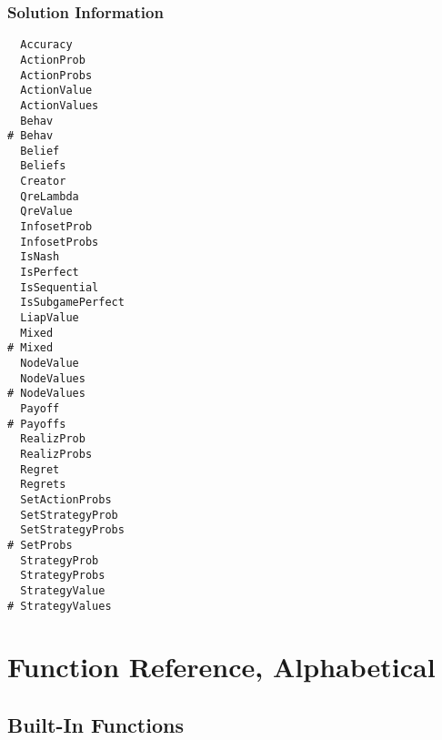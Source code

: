 \subsection{Solution Information}

\begin{multicols}{3}
\begin{verbatim}
  Accuracy
  ActionProb 
  ActionProbs 
  ActionValue 
  ActionValues 
  Behav 
# Behav 
  Belief 
  Beliefs 
  Creator
  QreLambda 
  QreValue 
  InfosetProb 
  InfosetProbs 
  IsNash 
  IsPerfect 
  IsSequential 
  IsSubgamePerfect 
  LiapValue 
  Mixed
# Mixed
  NodeValue 
  NodeValues 
# NodeValues 
  Payoff 
# Payoffs 
  RealizProb 
  RealizProbs 
  Regret
  Regrets
  SetActionProbs 
  SetStrategyProb 
  SetStrategyProbs 
# SetProbs
  StrategyProb 
  StrategyProbs
  StrategyValue 
# StrategyValues 
\end{verbatim}
\end{multicols}

\chapter{Function Reference, Alphabetical}
\pagestyle{lexicon}

\section{Built-In Functions}

